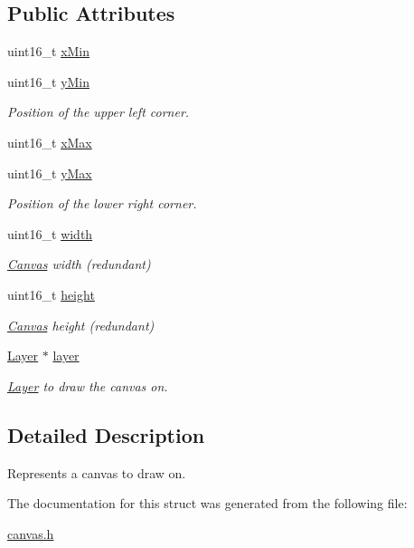 \subsection*{Public Attributes}
\begin{DoxyCompactItemize}
\item 
uint16\+\_\+t \mbox{\hyperlink{group__canvas_ga10925446227a312ac91f903acaf074e8}{x\+Min}}
\item 
uint16\+\_\+t \mbox{\hyperlink{group__canvas_ga91a71d5f9030202359d000a5fb54423a}{y\+Min}}
\begin{DoxyCompactList}\small\item\em Position of the upper left corner. \end{DoxyCompactList}\item 
uint16\+\_\+t \mbox{\hyperlink{group__canvas_ga423c26269827a5beb80f569ba8076ae2}{x\+Max}}
\item 
uint16\+\_\+t \mbox{\hyperlink{group__canvas_ga2990194f0baef3d23cb75299cc39987d}{y\+Max}}
\begin{DoxyCompactList}\small\item\em Position of the lower right corner. \end{DoxyCompactList}\item 
uint16\+\_\+t \mbox{\hyperlink{group__canvas_gaee9a970b56d8660b35047a170abc58ca}{width}}
\begin{DoxyCompactList}\small\item\em \mbox{\hyperlink{struct_canvas}{Canvas}} width (redundant) \end{DoxyCompactList}\item 
uint16\+\_\+t \mbox{\hyperlink{group__canvas_ga438a71c178c014aef3de261dbc7b483e}{height}}
\begin{DoxyCompactList}\small\item\em \mbox{\hyperlink{struct_canvas}{Canvas}} height (redundant) \end{DoxyCompactList}\item 
\mbox{\hyperlink{struct_layer}{Layer}} $\ast$ \mbox{\hyperlink{group__canvas_gaf72f42e64c0a72256001acc241f287ce}{layer}}
\begin{DoxyCompactList}\small\item\em \mbox{\hyperlink{struct_layer}{Layer}} to draw the canvas on. \end{DoxyCompactList}\end{DoxyCompactItemize}


\subsection{Detailed Description}
Represents a canvas to draw on. 

The documentation for this struct was generated from the following file\+:\begin{DoxyCompactItemize}
\item 
\mbox{\hyperlink{canvas_8h}{canvas.\+h}}\end{DoxyCompactItemize}
